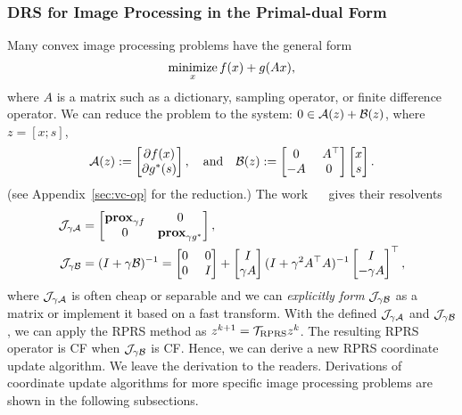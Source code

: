 \subsubsection{DRS for Image Processing in the Primal-dual Form \cite{o2014primal}}
Many convex image processing problems have the general form
$$\operatorname*{minimize}_{x} f(x) + g(Ax),$$
where $A$ is a matrix such as a dictionary, sampling operator, or finite difference operator. We can reduce the problem to the system: $0\in{\mathcal{A}}(z) + {\mathcal{B}}(z)$, where $z=[x;s]$,
$$\cA(z):=\begin{bmatrix}\partial f(x)\\\partial g^*(s)\end{bmatrix},\quad\mbox{and}\quad \cB(z):=\begin{bmatrix}0 & ~A^\top  \\ -A & 0\end{bmatrix}\begin{bmatrix}x\\s\end{bmatrix}.$$
(see Appendix~\ref{sec:vc-op} for the reduction.) The work \mbox{%
\cite{o2014primal} }%
gives their resolvents    
\begin{align*}\cJ_{\gamma \cA} &= \begin{bmatrix}\prox_{\gamma f}&0\\0&\prox_{\gamma g^*}\end{bmatrix},\\ 
\cJ_{\gamma \cB} &= (I+\gamma \cB)^{-1}= \begin{bmatrix} 0 &~ 0 \\ 0 &~ I\end{bmatrix}+\begin{bmatrix}I\\ \gamma A\end{bmatrix}(I+\gamma^2 A^\top A)^{-1}\begin{bmatrix}I\\ -\gamma A\end{bmatrix}^\top ,
\end{align*}
where ${\mathcal{J}}_{\gamma {\mathcal{A}}}$ is often cheap or separable and we can \emph{explicitly form}  ${\mathcal{J}}_{\gamma {\mathcal{B}}}$  as a matrix or implement it based on a fast transform. With the defined ${\mathcal{J}}_{\gamma {\mathcal{A}}}$ and ${\mathcal{J}}_{\gamma {\mathcal{B}}}$, we can apply the RPRS method as $z^{k+1} = {\mathcal{T}}_{\text{RPRS}} z^k$. The resulting RPRS operator is CF when ${\mathcal{J}}_{\gamma {\mathcal{B}}}$ is CF. Hence, we can derive a new RPRS coordinate update algorithm. We leave the derivation to the readers. Derivations of coordinate update algorithms for more specific image processing problems are shown in the following subsections.


